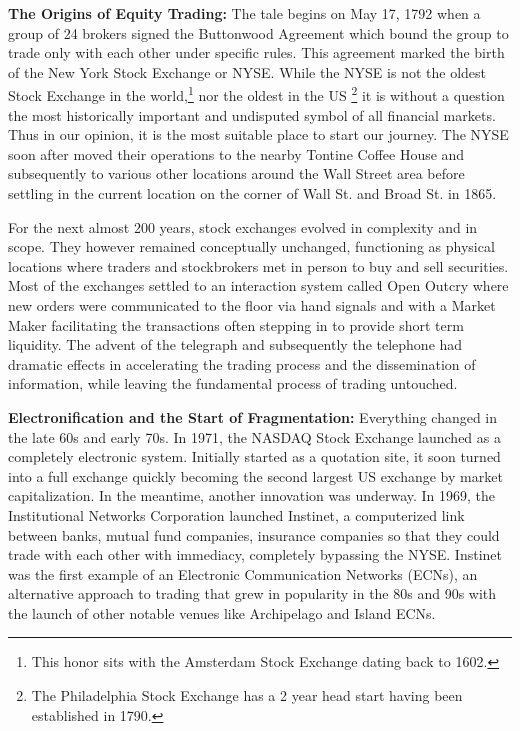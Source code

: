 \noindent\textbf{The Origins of Equity Trading:} The tale begins on May 17, 1792 when a group of 24 brokers signed the Buttonwood Agreement which bound the group to trade only with each other under specific rules. This agreement marked the birth of the New York Stock Exchange or NYSE. While the NYSE is not the oldest Stock Exchange in the world,\footnote{This honor sits with the Amsterdam Stock Exchange dating back to 1602.} nor the oldest in the US \footnote{The Philadelphia Stock Exchange has a 2 year head start having been established in 1790.} it is without a question the most historically important and undisputed symbol of all financial markets. Thus in our opinion, it is the most suitable place to start our journey. The NYSE soon after moved their operations to the nearby Tontine Coffee House and subsequently to various other locations around the Wall Street area before settling in the current location on the corner of Wall St. and Broad St. in 1865.


For the next almost 200 years, stock exchanges evolved in complexity and in scope. They however remained conceptually unchanged, functioning as physical locations where traders and stockbrokers met in person to buy and sell securities. Most of the exchanges settled to an interaction system called Open Outcry where new orders were communicated to the floor via hand signals and with a Market Maker facilitating the transactions often stepping in to provide short term liquidity. The advent of the telegraph and subsequently the telephone had dramatic effects in accelerating the trading process and the dissemination of information, while leaving the fundamental process of trading  untouched. \twomedskip


\noindent\textbf{Electronification and the Start of Fragmentation:} Everything changed in the late 60s and early 70s. In 1971, the NASDAQ Stock Exchange launched as a completely electronic system. Initially started as a quotation site, it soon turned into a full exchange quickly becoming the second largest US exchange by market capitalization. In the meantime, another innovation was underway. In 1969, the Institutional Networks Corporation launched Instinet, a computerized link between banks, mutual fund companies, insurance companies so that they could trade with each other with immediacy, completely bypassing the NYSE. Instinet was the first example of an Electronic Communication Networks (ECNs), an alternative approach to trading that grew in popularity in the 80s and 90s with the launch of other notable venues like Archipelago and Island ECNs.


